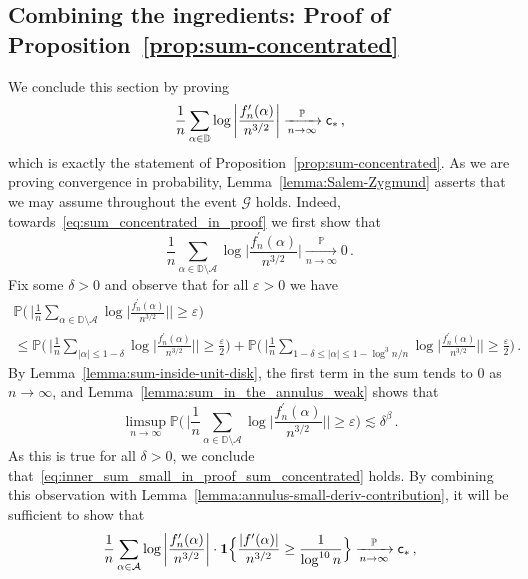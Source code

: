 \documentclass[11pt]{amsart}
\theoremstyle{remark}
\theoremstyle{definition}
\def\eps{{\varepsilon}}
\newcommand{\bD}{\mathbb D}
\newcommand{\bP}{\mathbb P}
\newcommand{\cA}{\mathcal A}
\newcommand{\cG}{\mathcal G}
\newcommand{\one}{\boldsymbol{1}}
\begin{document}
    \subsection{Combining the ingredients: Proof of Proposition~\ref{prop:sum-concentrated}}
    We conclude this section by proving
    \begin{equation}
    \label{eq:sum_concentrated_in_proof}
           \frac{1}{n} \sum_{\alpha\in \bD} \log \left|\frac{f_n'(\alpha)}{n^{3/2}} \right| \xrightarrow[n\to \infty]{\bP} {\sf c}_\ast \, ,
    \end{equation}
    which is exactly the statement of Proposition~\ref{prop:sum-concentrated}. As we are proving convergence in probability, Lemma~\ref{lemma:Salem-Zygmund} asserts that we may assume throughout the event $\cG$ holds. 
    Indeed, towards~\eqref{eq:sum_concentrated_in_proof} we first show that 
    \begin{equation}
        \label{eq:inner_sum_small_in_proof_sum_concentrated}
        \frac{1}{n} \sum_{\alpha\in \bD\setminus \cA} \log\Big|\frac{f_n^\prime(\alpha)}{n^{3/2}}\Big| \xrightarrow[n\to \infty]{\bP} 0 \, .
    \end{equation}
    Fix some $\delta>0$ and observe that for all $\eps>0$ we have
    \begin{multline*}
        \bP\bigg( \, \bigg| \frac{1}{n} \sum_{\alpha\in \bD\setminus \cA} \log\Big|\frac{f_n^\prime(\alpha)}{n^{3/2}}\Big|\bigg| \ge \eps \bigg) \\ \le \bP\bigg( \, \bigg| \frac{1}{n} \sum_{|\alpha| \le 1-\delta} \log\Big|\frac{f_n^\prime(\alpha)}{n^{3/2}}\Big|\bigg| \ge \frac{\eps}{2} \bigg) + \bP\bigg( \, \bigg| \frac{1}{n} \sum_{1-\delta\le |\alpha| \le 1-\log^3 n/n} \log\Big|\frac{f_n^\prime(\alpha)}{n^{3/2}}\Big|\bigg| \ge \frac{\eps}{2} \bigg) \, . 
    \end{multline*}
    By Lemma~\ref{lemma:sum-inside-unit-disk}, the first term in the sum tends to $0$ as $n\to\infty$, and Lemma~\ref{lemma:sum_in_the_annulus_weak} shows that
    \[
    \limsup_{n\to\infty} \bP\bigg( \, \bigg| \frac{1}{n} \sum_{\alpha\in \bD\setminus \cA} \log\Big|\frac{f_n^\prime(\alpha)}{n^{3/2}}\Big|\bigg| \ge \eps \bigg) \lesssim \delta^\beta \, .
    \]
    As this is true for all $\delta>0$, we conclude that~\eqref{eq:inner_sum_small_in_proof_sum_concentrated} holds. By combining this observation with Lemma~\ref{lemma:annulus-small-deriv-contribution}, it will be sufficient to show that
    \begin{equation*}
           \frac{1}{n} \sum_{\alpha\in \cA} \log \left|\frac{f_n'(\alpha)}{n^{3/2}} \right| \cdot \one\Big\{\frac{|f'(\alpha)|}{n^{3/2}} \ge \frac{1}{\log^{10} n} \Big\}   \xrightarrow[n\to \infty]{\bP} {\sf c}_\ast \, ,
    \end{equation*}
\end{document}
